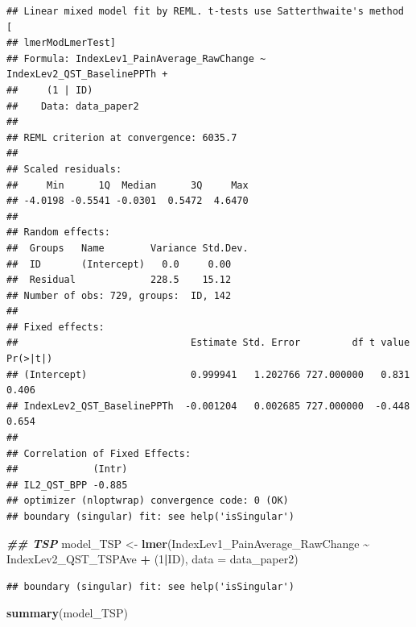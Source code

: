 \documentclass[
  12pt,
]{article}
\newenvironment{Shaded}{\begin{snugshade}}{\end{snugshade}}
\newcommand{\AttributeTok}[1]{\textcolor[rgb]{0.13,0.29,0.53}{#1}}
\newcommand{\DecValTok}[1]{\textcolor[rgb]{0.00,0.00,0.81}{#1}}
\newcommand{\DocumentationTok}[1]{\textcolor[rgb]{0.56,0.35,0.01}{\textbf{\textit{#1}}}}
\newcommand{\FunctionTok}[1]{\textcolor[rgb]{0.13,0.29,0.53}{\textbf{#1}}}
\newcommand{\NormalTok}[1]{#1}
\newcommand{\OtherTok}[1]{\textcolor[rgb]{0.56,0.35,0.01}{#1}}
\newcommand{\SpecialCharTok}[1]{\textcolor[rgb]{0.81,0.36,0.00}{\textbf{#1}}}
\begin{document}
\begin{verbatim}
## Linear mixed model fit by REML. t-tests use Satterthwaite's method [
## lmerModLmerTest]
## Formula: IndexLev1_PainAverage_RawChange ~ IndexLev2_QST_BaselinePPTh +  
##     (1 | ID)
##    Data: data_paper2
## 
## REML criterion at convergence: 6035.7
## 
## Scaled residuals: 
##     Min      1Q  Median      3Q     Max 
## -4.0198 -0.5541 -0.0301  0.5472  4.6470 
## 
## Random effects:
##  Groups   Name        Variance Std.Dev.
##  ID       (Intercept)   0.0     0.00   
##  Residual             228.5    15.12   
## Number of obs: 729, groups:  ID, 142
## 
## Fixed effects:
##                              Estimate Std. Error         df t value Pr(>|t|)
## (Intercept)                  0.999941   1.202766 727.000000   0.831    0.406
## IndexLev2_QST_BaselinePPTh  -0.001204   0.002685 727.000000  -0.448    0.654
## 
## Correlation of Fixed Effects:
##             (Intr)
## IL2_QST_BPP -0.885
## optimizer (nloptwrap) convergence code: 0 (OK)
## boundary (singular) fit: see help('isSingular')
\end{verbatim}

\begin{Shaded}
\begin{Highlighting}[]
\DocumentationTok{\#\# TSP }
\NormalTok{model\_TSP }\OtherTok{\textless{}{-}} \FunctionTok{lmer}\NormalTok{(IndexLev1\_PainAverage\_RawChange }\SpecialCharTok{\textasciitilde{}}\NormalTok{ IndexLev2\_QST\_TSPAve }\SpecialCharTok{+}\NormalTok{ (}\DecValTok{1}\SpecialCharTok{|}\NormalTok{ID), }\AttributeTok{data =}\NormalTok{ data\_paper2)}
\end{Highlighting}
\end{Shaded}

\begin{verbatim}
## boundary (singular) fit: see help('isSingular')
\end{verbatim}

\begin{Shaded}
\begin{Highlighting}[]
\FunctionTok{summary}\NormalTok{(model\_TSP)}
\end{Highlighting}
\end{Shaded}
\end{document}
